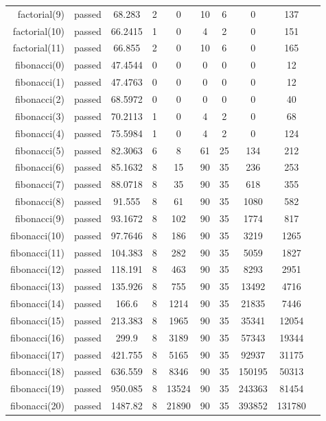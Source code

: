 \begin{longtable}{r|ccccccccc}
    factorial(9) & passed & 68.283 & 2 & 0 & 10 & 6 & 0 & 137 \\
    factorial(10) & passed & 66.2415 & 1 & 0 & 4 & 2 & 0 & 151 \\
    factorial(11) & passed & 66.855 & 2 & 0 & 10 & 6 & 0 & 165 \\
    fibonacci(0) & passed & 47.4544 & 0 & 0 & 0 & 0 & 0 & 12 \\
    fibonacci(1) & passed & 47.4763 & 0 & 0 & 0 & 0 & 0 & 12 \\
    fibonacci(2) & passed & 68.5972 & 0 & 0 & 0 & 0 & 0 & 40 \\
    fibonacci(3) & passed & 70.2113 & 1 & 0 & 4 & 2 & 0 & 68 \\
    fibonacci(4) & passed & 75.5984 & 1 & 0 & 4 & 2 & 0 & 124 \\
    fibonacci(5) & passed & 82.3063 & 6 & 8 & 61 & 25 & 134 & 212 \\
    fibonacci(6) & passed & 85.1632 & 8 & 15 & 90 & 35 & 236 & 253 \\
    fibonacci(7) & passed & 88.0718 & 8 & 35 & 90 & 35 & 618 & 355 \\
    fibonacci(8) & passed & 91.555 & 8 & 61 & 90 & 35 & 1080 & 582 \\
    fibonacci(9) & passed & 93.1672 & 8 & 102 & 90 & 35 & 1774 & 817 \\
    fibonacci(10) & passed & 97.7646 & 8 & 186 & 90 & 35 & 3219 & 1265 \\
    fibonacci(11) & passed & 104.383 & 8 & 282 & 90 & 35 & 5059 & 1827 \\
    fibonacci(12) & passed & 118.191 & 8 & 463 & 90 & 35 & 8293 & 2951 \\
    fibonacci(13) & passed & 135.926 & 8 & 755 & 90 & 35 & 13492 & 4716 \\
    fibonacci(14) & passed & 166.6 & 8 & 1214 & 90 & 35 & 21835 & 7446 \\
    fibonacci(15) & passed & 213.383 & 8 & 1965 & 90 & 35 & 35341 & 12054 \\
    fibonacci(16) & passed & 299.9 & 8 & 3189 & 90 & 35 & 57343 & 19344 \\
    fibonacci(17) & passed & 421.755 & 8 & 5165 & 90 & 35 & 92937 & 31175 \\
    fibonacci(18) & passed & 636.559 & 8 & 8346 & 90 & 35 & 150195 & 50313 \\
    fibonacci(19) & passed & 950.085 & 8 & 13524 & 90 & 35 & 243363 & 81454 \\
    fibonacci(20) & passed & 1487.82 & 8 & 21890 & 90 & 35 & 393852 & 131780 \\

\end{longtable}
